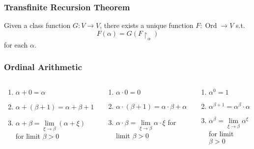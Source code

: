\documentclass[UTF8,11pt,colorlinks,compress,openany]{beamer}%
\begin{document}
\begin{frame}\frametitle{Transfinite Recursion Theorem}
	\begin{theorem}
		Given a class function $G: V\to V$, there exists a unique function $F: \operatorname{Ord}\to V$ s.t.
		\[F(\alpha)=G(F{\restriction_\alpha})\]
		for each $\alpha$.
	\end{theorem}
\end{frame}

\begin{frame}\frametitle{Ordinal Arithmetic}\vspace{-8pt}
\setlength\abovedisplayskip{0pt}
\setlength\belowdisplayskip{0pt}
	\begin{columns}
			\begin{definition}[Addition]
				\begin{enumerate}
					\item $\alpha+0=\alpha$
					\item $\alpha+(\beta+1)=\alpha+\beta+1$
					\item $\alpha+\beta=\lim\limits_{\xi\to\beta}(\alpha+\xi)$ for limit $\beta>0$
				\end{enumerate}
			\end{definition}\vspace{-1ex}
			\begin{definition}[Multiplication]
				\begin{enumerate}
					\item $\alpha\cdot 0=0$
					\item $\alpha\cdot(\beta+1)=\alpha\cdot\beta+\alpha$
					\item $\alpha\cdot\beta=\lim\limits_{\xi\to\beta}\alpha\cdot\xi$ for limit $\beta>0$
				\end{enumerate}
			\end{definition}\vspace{-1ex}
			\begin{definition}[Exponentiation]
				\begin{enumerate}
					\item $\alpha^0=1$
					\item $\alpha^{\beta+1}=\alpha^\beta\cdot\alpha$
					\item $\alpha^\beta=\lim\limits_{\xi\to\beta}\alpha^\xi$ for limit $\beta>0$
				\end{enumerate}
			\end{definition}
			\resizebox{.8\textwidth}{!}{
				\begin{minipage}{\textwidth}

\end{minipage}}
\end{columns}
\end{frame}
\end{document}
